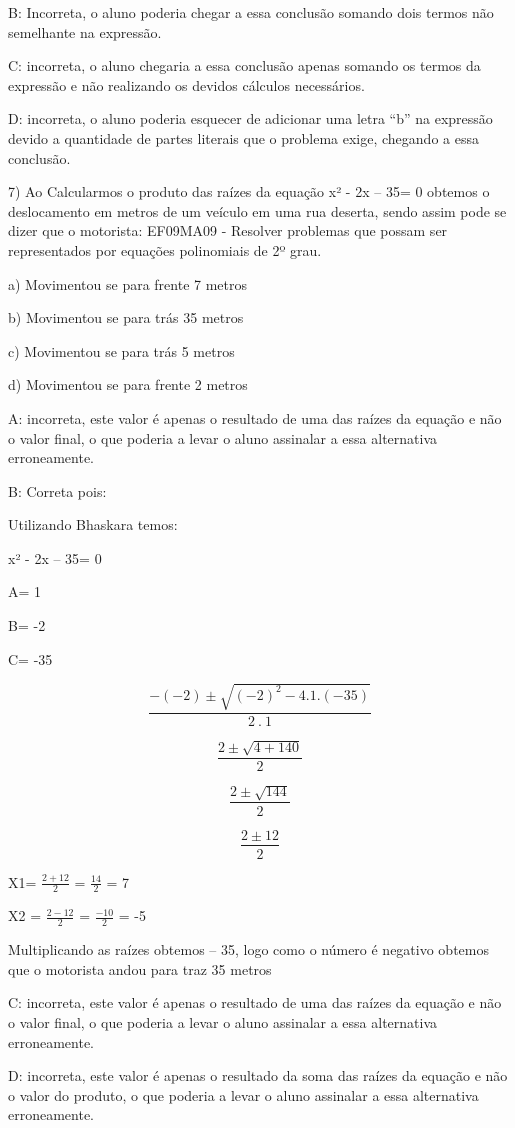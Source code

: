 B: Incorreta, o aluno poderia chegar a essa conclusão somando dois
termos não semelhante na expressão.

C: incorreta, o aluno chegaria a essa conclusão apenas somando os termos
da expressão e não realizando os devidos cálculos necessários.

D: incorreta, o aluno poderia esquecer de adicionar uma letra ``b'' na
expressão devido a quantidade de partes literais que o problema exige,
chegando a essa conclusão.

7) Ao Calcularmos o produto das raízes da equação x² - 2x -- 35= 0
obtemos o deslocamento em metros de um veículo em uma rua deserta, sendo
assim pode se dizer que o motorista: EF09MA09 - Resolver problemas que
possam ser representados por equações polinomiais de 2º grau.

a) Movimentou se para frente 7 metros

b) Movimentou se para trás 35 metros

c) Movimentou se para trás 5 metros

d) Movimentou se para frente 2 metros

A: incorreta, este valor é apenas o resultado de uma das raízes da
equação e não o valor final, o que poderia a levar o aluno assinalar a
essa alternativa erroneamente.

B: Correta pois:

Utilizando Bhaskara temos:

x² - 2x -- 35= 0

A= 1

B= -2

C= -35

\[\frac{- ( - 2) \pm \sqrt{{( - 2)}^{2} - 4.1.( - 35)}}{2\ .\ 1}\]

\[\frac{2 \pm \sqrt{4 + 140}}{2}\]

\[\frac{2 \pm \sqrt{144}}{2}\]

\[\frac{2 \pm 12}{2}\]

X1= \(\frac{2 + 12}{2}\) = \(\frac{14}{2}\) = 7

X2 = \(\frac{2 - 12}{2}\) = \(\frac{- 10}{2}\) = -5

Multiplicando as raízes obtemos -- 35, logo como o número é negativo
obtemos que o motorista andou para traz 35 metros

C: incorreta, este valor é apenas o resultado de uma das raízes da
equação e não o valor final, o que poderia a levar o aluno assinalar a
essa alternativa erroneamente.

D: incorreta, este valor é apenas o resultado da soma das raízes da
equação e não o valor do produto, o que poderia a levar o aluno
assinalar a essa alternativa erroneamente.

